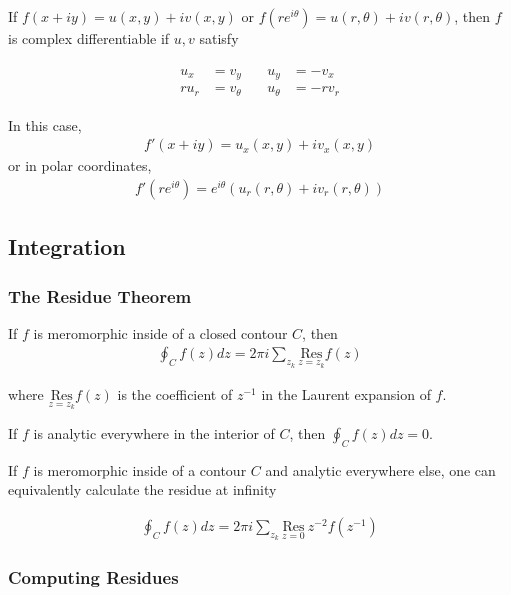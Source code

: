 If \(f(x+iy) = u(x,y) + iv(x,y)\) or
\(f(re^{i\theta}) = u(r,\theta) + iv(r,\theta)\), then \(f\) is complex
differentiable if \(u,v\) satisfy

\begin{align*}\begin{aligned}
    u_x &= v_y &\quad u_y &= -v_x \\
    r u_r &= v_\theta &\quad u_\theta &= -r v_r\end{aligned}\end{align*}

In this case,
\begin{align*}f'(x+iy) = u_x(x,y) + iv_x(x,y)\end{align*} or in polar
coordinates,
\begin{align*}f'(re^{i\theta}) = e^{i\theta}(u_r(r,\theta) + iv_r(r,\theta))\end{align*}

\hypertarget{integration}{%
\subsection{Integration}\label{integration}}

\hypertarget{the-residue-theorem}{%
\subsubsection{The Residue Theorem}\label{the-residue-theorem}}

If \(f\) is meromorphic inside of a closed contour \(C\), then
\begin{align*}\oint_C f(z) dz = 2\pi i \sum_{z_k} \underset{z=z_k}{\text{Res}} f(z)\end{align*}

where \(\underset{z=z_k}{\text{Res}} f(z)\) is the coefficient of
\(z^{-1}\) in the Laurent expansion of \(f\).

If \(f\) is analytic everywhere in the interior of \(C\), then
\(\oint_C f(z) dz = 0\).

If \(f\) is meromorphic inside of a contour \(C\) and analytic
everywhere else, one can equivalently calculate the residue at infinity

\begin{align*}\oint_C f(z) dz = 2\pi i \sum_{z_k} \underset{z=0}{\text{Res}} ~z^{-2}f(z^{-1})\end{align*}

\hypertarget{computing-residues}{%
\subsubsection{Computing Residues}\label{computing-residues}}

